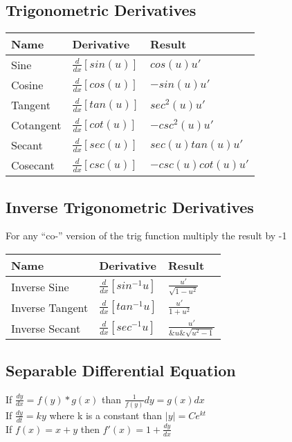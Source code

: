 \documentclass[17pt]{extarticle}
\begin{document}
\subsection{Trigonometric Derivatives}
\renewcommand{\arraystretch}{2}
\begin{table}[H]
\centering
\begin{tabular}{|l|l|l|}
\hline
\rowcolor{githublightgray}
Name & Derivative & Result\\
\hline
Sine&$\frac{d}{dx}[sin(u)]$&$cos(u)u\prime$\\
\hline
Cosine&$\frac{d}{dx}[cos(u)]$&$-sin(u)u\prime$\\
\hline
Tangent&$\frac{d}{dx}[tan(u)]$&$sec^2(u)u\prime$\\
\hline
Cotangent&$\frac{d}{dx}[cot(u)]$&$-csc^2(u)u\prime$\\
\hline
Secant&$\frac{d}{dx}[sec(u)]$&$sec(u)tan(u)u\prime$\\
\hline
Cosecant&$\frac{d}{dx}[csc(u)]$&$-csc(u)cot(u)u\prime$\\
\hline
\end{tabular}
\end{table}

\subsection{Inverse Trigonometric Derivatives}
For any ``co-'' version of the trig function multiply the result by -1
\renewcommand{\arraystretch}{2}
\begin{table}[H]
\centering
\begin{tabular}{|l|l|l|}
\hline
\rowcolor{githublightgray}
Name & Derivative & Result\\
\hline
Inverse Sine&$\frac{d}{dx}[sin^{-1}u]$&$\frac{u\prime}{\sqrt{1-u^2}}$\\
\hline
Inverse Tangent&$\frac{d}{dx}[tan^{-1}u]$&$\frac{u\prime}{1+u^2}$\\
\hline
Inverse Secant&$\frac{d}{dx}[sec^{-1}u]$&$\frac{u\prime}{\&u\&\sqrt{u^2-1}}$\\
\hline
\end{tabular}
\end{table}

\subsection{Separable Differential Equation}
If $\frac{dy}{dx}=f(y)*g(x)$ than $\frac{1}{f(y)}dy=g(x)dx$\\
If $\frac{dy}{dt} = ky$ where k is a constant than $\lvert y\rvert=Ce^{kt}$\\
If $f(x)=x+y$ then $f\prime(x)=1+\frac{dy}{dx}$\\
\clearpage
\end{document}
